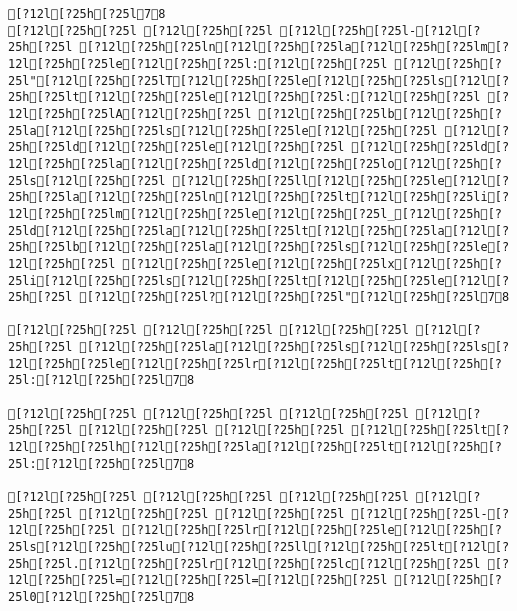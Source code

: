 \documentclass{scrartcl}
\begin{document}
\begin{Verbatim}
[?12l[?25h[?25l78
[?12l[?25h[?25l [?12l[?25h[?25l [?12l[?25h[?25l-[?12l[?25h[?25l [?12l[?25h[?25ln[?12l[?25h[?25la[?12l[?25h[?25lm[?12l[?25h[?25le[?12l[?25h[?25l:[?12l[?25h[?25l [?12l[?25h[?25l"[?12l[?25h[?25lT[?12l[?25h[?25le[?12l[?25h[?25ls[?12l[?25h[?25lt[?12l[?25h[?25le[?12l[?25h[?25l:[?12l[?25h[?25l [?12l[?25h[?25lA[?12l[?25h[?25l [?12l[?25h[?25lb[?12l[?25h[?25la[?12l[?25h[?25ls[?12l[?25h[?25le[?12l[?25h[?25l [?12l[?25h[?25ld[?12l[?25h[?25le[?12l[?25h[?25l [?12l[?25h[?25ld[?12l[?25h[?25la[?12l[?25h[?25ld[?12l[?25h[?25lo[?12l[?25h[?25ls[?12l[?25h[?25l [?12l[?25h[?25ll[?12l[?25h[?25le[?12l[?25h[?25la[?12l[?25h[?25ln[?12l[?25h[?25lt[?12l[?25h[?25li[?12l[?25h[?25lm[?12l[?25h[?25le[?12l[?25h[?25l_[?12l[?25h[?25ld[?12l[?25h[?25la[?12l[?25h[?25lt[?12l[?25h[?25la[?12l[?25h[?25lb[?12l[?25h[?25la[?12l[?25h[?25ls[?12l[?25h[?25le[?12l[?25h[?25l [?12l[?25h[?25le[?12l[?25h[?25lx[?12l[?25h[?25li[?12l[?25h[?25ls[?12l[?25h[?25lt[?12l[?25h[?25le[?12l[?25h[?25l [?12l[?25h[?25l?[?12l[?25h[?25l"[?12l[?25h[?25l78

[?12l[?25h[?25l [?12l[?25h[?25l [?12l[?25h[?25l [?12l[?25h[?25l [?12l[?25h[?25la[?12l[?25h[?25ls[?12l[?25h[?25ls[?12l[?25h[?25le[?12l[?25h[?25lr[?12l[?25h[?25lt[?12l[?25h[?25l:[?12l[?25h[?25l78

[?12l[?25h[?25l [?12l[?25h[?25l [?12l[?25h[?25l [?12l[?25h[?25l [?12l[?25h[?25l [?12l[?25h[?25l [?12l[?25h[?25lt[?12l[?25h[?25lh[?12l[?25h[?25la[?12l[?25h[?25lt[?12l[?25h[?25l:[?12l[?25h[?25l78

[?12l[?25h[?25l [?12l[?25h[?25l [?12l[?25h[?25l [?12l[?25h[?25l [?12l[?25h[?25l [?12l[?25h[?25l [?12l[?25h[?25l-[?12l[?25h[?25l [?12l[?25h[?25lr[?12l[?25h[?25le[?12l[?25h[?25ls[?12l[?25h[?25lu[?12l[?25h[?25ll[?12l[?25h[?25lt[?12l[?25h[?25l.[?12l[?25h[?25lr[?12l[?25h[?25lc[?12l[?25h[?25l [?12l[?25h[?25l=[?12l[?25h[?25l=[?12l[?25h[?25l [?12l[?25h[?25l0[?12l[?25h[?25l78


\end{Verbatim}
\end{document}
